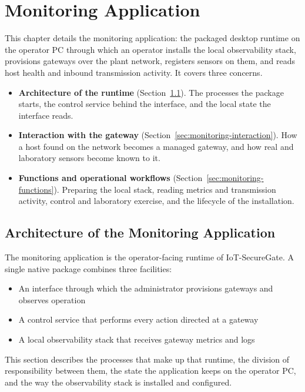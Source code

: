 \documentclass[12pt,a4paper]{report}
\begin{document}
\chapter{Monitoring Application}
\label{ch:monitoring}


This chapter details the monitoring application: the packaged
desktop runtime on the operator PC through which an operator
installs the local observability stack, provisions gateways over
the plant network, registers sensors on them, and reads host
health and inbound transmission activity. It covers three
concerns.

\begin{itemize}
    \item \textbf{Architecture of the runtime}
    (Section~\ref{sec:monitoring-architecture}).
    The processes the package starts, the control service behind
    the interface, and the local state the interface reads.
    \item \textbf{Interaction with the gateway}
    (Section~\ref{sec:monitoring-interaction}).
    How a host found on the network becomes a managed gateway,
    and how real and laboratory sensors become known to it.
    \item \textbf{Functions and operational workflows}
    (Section~\ref{sec:monitoring-functions}).
    Preparing the local stack, reading metrics and transmission
    activity, control and laboratory exercise, and the lifecycle
    of the installation.
\end{itemize}

\section{Architecture of the Monitoring Application}
\label{sec:monitoring-architecture}

The monitoring application is the operator-facing runtime of
IoT-SecureGate. A single native package combines three facilities:
\begin{itemize}
    \item An interface through which the administrator provisions gateways and observes operation
    \item A control service that performs every action directed at a gateway
    \item A local observability stack that receives gateway metrics and logs
\end{itemize}
This section describes the processes that make up that runtime, the division of
responsibility between them, the state the application keeps on
the operator PC, and the way the observability stack is installed
and configured.
\end{document}
